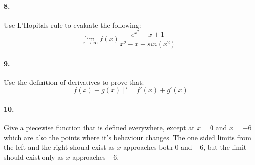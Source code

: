 \documentclass[12pt]{article}
\begin{document}
	\paragraph{8.}
	Use L'Hopitals rule to evaluate the following:
	$$ \lim_{x\to\infty} f(x) \frac{e^{x^2}-x+1}{x^2-x+sin(x^2)}$$
	
	\paragraph{9.}
	Use the definition of derivatives to prove that:
	$$[f(x)+g(x)]' = f'(x)+g'(x)$$
	
	\paragraph{10.}
	Give a piecewise function that is defined everywhere, except at $x=0$ and $x=-6$ which are also the points where it's behaviour changes. The one sided limits from the left and the right should exist as $x$ approaches both $0$ and $-6$, but the limit should exist only as $x$ approaches $-6$.
\end{document}
